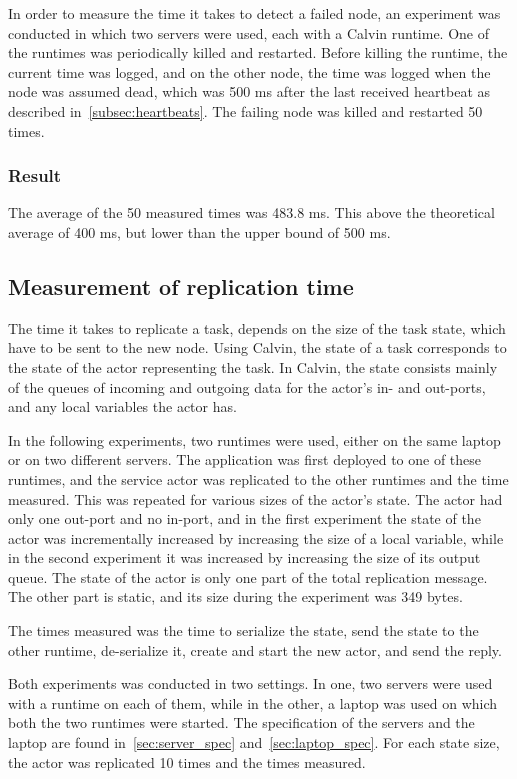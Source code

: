 \documentclass{cslthse-msc}
\begin{document}
In order to measure the time it takes to detect a failed node, an experiment was conducted in which two servers were used, each with a Calvin runtime. One of the runtimes was periodically killed and restarted. Before killing the runtime, the current time was logged, and on the other node, the time was logged when the node was assumed dead, which was 500 ms after the last received heartbeat as described in~\cref{subsec:heartbeats}. The failing node was killed and restarted 50 times.

\subsubsection*{Result}
The average of the 50 measured times was 483.8 ms. This above the theoretical average of 400 ms, but lower than the upper bound of 500 ms. 

\subsection{Measurement of replication time} \label{sec:eval_repl_time}
The time it takes to replicate a task, depends on the size of the task state, which have to be sent to the new node. Using Calvin, the state of a task corresponds to the state of the actor representing the task. In Calvin, the state consists mainly of the queues of incoming and outgoing data for the actor's in- and out-ports, and any local variables the actor has.

In the following experiments, two runtimes were used, either on the same laptop or on two different servers. The application was first deployed to one of these runtimes, and the service actor was replicated to the other runtimes and the time measured. This was repeated for various sizes of the actor's state. The actor had only one out-port and no in-port, and in the first experiment the state of the actor was incrementally increased by increasing the size of a local variable, while in the second experiment it was increased by increasing the size of its output queue. The state of the actor is only one part of the total replication message. The other part is static, and its size during the experiment was 349 bytes.

The times measured was the time to serialize the state, send the state to the other runtime, de-serialize it, create and start the new actor, and send the reply.

Both experiments was conducted in two settings. In one, two servers were used with a runtime on each of them, while in the other, a laptop was used on which both the two runtimes were started. The specification of the servers and the laptop are found in~\cref{sec:server_spec} and~\cref{sec:laptop_spec}. For each state size, the actor was replicated 10 times and the times measured.
\end{document}
